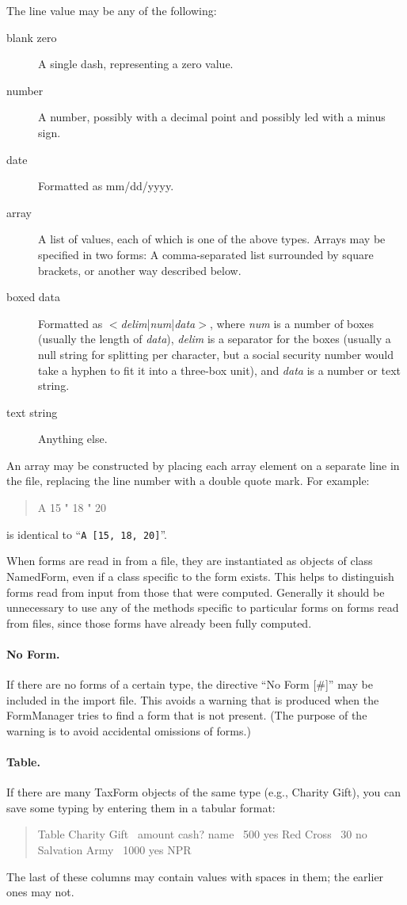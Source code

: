 The line value may be any of the following:
\begin{description}
\item[blank zero] A single dash, representing a zero value.
\item[number] A number, possibly with a decimal point and possibly led with a
minus sign.
\item[date] Formatted as mm/dd/yyyy.
\item[array] A list of values, each of which is one of the above types. Arrays
may be specified in two forms: A comma-separated list surrounded by square
brackets, or another way described below.
\item[boxed data] Formatted as
$<$\emph{delim}|\emph{num}|\emph{data}$>$, where \emph{num} is a
number of boxes (usually the length of \emph{data}), \emph{delim} is a separator
for the boxes (usually a null string for splitting per character, but a social
security number would take a hyphen to fit it into a three-box unit), and
\emph{data} is a number or text string.
\item[text string] Anything else.
\end{description}

An array may be constructed by placing each array element on a separate line in
the file, replacing the line number with a double quote mark. For example:
\begin{quote}
\ttfamily\obeylines\obeyspaces
A   15
"   18
"   20
\end{quote}
is identical to ``\texttt{A [15, 18, 20]}''.

When forms are read in from a file, they are instantiated as objects of class
NamedForm, even if a class specific to the form exists. This helps to
distinguish forms read from input from those that were computed. Generally it
should be unnecessary to use any of the methods specific to particular forms on
forms read from files, since those forms have already been fully computed.

\paragraph{No Form.} If there are no forms of a certain type, the directive ``No
Form [\#]'' may be included in the import file. This avoids a warning that is
produced when the FormManager tries to find a form that is not present. (The
purpose of the warning is to avoid accidental omissions of forms.)

\paragraph{Table.} If there are many TaxForm objects of the same type (e.g.,
Charity Gift), you can save some typing by entering them in a tabular format:
\begin{quote}
\ttfamily\obeylines\frenchspacing\obeyspaces
Table Charity Gift
\    amount   cash?   name
\    500      yes     Red Cross
\    30       no      Salvation Army
\    1000     yes     NPR
\end{quote}
The last of these columns may contain values with spaces in them; the earlier
ones may not.


